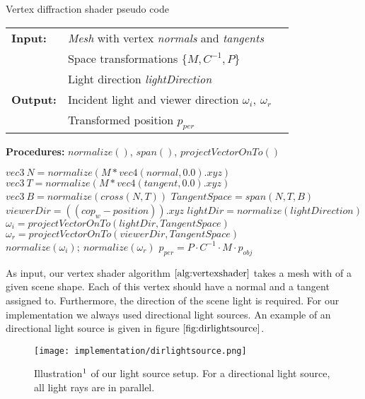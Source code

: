 \begin{algorithm}[H]
\caption{Vertex diffraction shader pseudo code}
\begin{table}[H]
  \begin{tabular}{@{}lll@{}}
    \textbf{Input:} & \emph{Mesh} with vertex \emph{normals} and \emph{tangents}  \\
    & Space transformations $\{M, C^{-1}, P\}$  \\
    & Light direction \emph{lightDirection}  \\
    \textbf{Output:} & Incident light and viewer direction $\omega_i,\ \omega_r$ \\
    & Transformed position $p_{per}$ \\
  \end{tabular} 
\end{table}
\textbf{Procedures:} $normalize()$, $span()$, $projectVectorOnTo()$  \\
\setlength{\fboxrule}{0pt} 
\begin{boxedminipage}{1.0\textwidth}
  \begin{algorithmic}[1]
        \State $ vec3 \ N = normalize(M * vec4(normal,0.0).xyz)$
        \State $ vec3 \ T = normalize(M * vec4(tangent,0.0).xyz)$
        \State $ vec3 \ B = normalize(cross(N, T))$
        \State $ TangentSpace = span(N, T, B)$
        \State $ viewerDir = ((cop_{w}-position)).xyz$
        \State $ lightDir = normalize(lightDirection)$
        \State $ \omega_i = projectVectorOnTo(lightDir, TangentSpace)$
        \State $ \omega_r = projectVectorOnTo(viewerDir, TangentSpace)$
        \State $normalize(\omega_i); \ normalize(\omega_r)$
        \State $p_{per} = P \cdot C^{-1} \cdot M \cdot p_{obj}$
      \EndFor
  \end{algorithmic}
  \end{boxedminipage}
  \vskip1.5pt
\label{alg:vertexshader}
\end{algorithm}

As input, our vertex shader algorithm $\ref{alg:vertexshader}$ takes a mesh with of a given scene shape. Each of this vertex should have a normal and a tangent assigned to. Furthermore, the direction of the scene light is required. For our implementation we always used directional light sources. An example of an directional light source is given in figure $\ref{fig:dirlightsource}$. 

\begin{figure}[H]
  \centering
  \texttt{[image: implementation/dirlightsource.png]}
  \caption[Rays of a Directional Light]{Illustration$\footnotemark$ of our light source setup. For a directional light source, all light rays are in parallel.}
  \label{fig:dirlightsource}
\end{figure}

